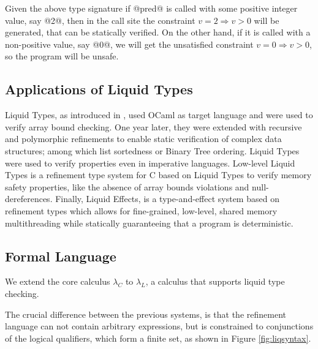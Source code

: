 Given the above type signature 
if @pred@ is called with some positive integer value, say @2@,
then in the call site the constraint $v = 2 \Rightarrow v >0$ will be generated, 
that can be statically verified.
%
On the other hand, if it is called with a non-positive value, 
say @0@, we will get the unsatisfied constraint
$v = 0 \Rightarrow v > 0$, 
so the program will be unsafe.

\subsection{Applications of Liquid Types}
Liquid Types, as introduced in \cite{LiquidPLDI08}, used OCaml as target language
and were used to verify array bound checking.
One year later\cite{LiquidPLDI09}, they were extended with recursive and polymorphic refinements
to enable static verification of complex data structures; among which 
list sortedness or Binary Tree ordering.
%
Liquid Types were used to verify properties even in imperative languages.
Low-level Liquid Types\cite{Rondon10} is a refinement type system for
C based on Liquid Types to verify memory safety properties, 
like the absence of array bounds violations
and null-dereferences.
Finally, Liquid Effects\cite{Kawaguchi12},
is a type-and-effect system based on refinement types
which allows for fine-grained, low-level, shared memory multithreading while statically guaranteeing that a program is deterministic. 

\subsection{Formal Language}
We extend the core calculus $\lambda_C$ to $\lambda_L$, 
a calculus that supports liquid type checking.

The crucial difference between the previous systems, is that 
the refinement language 
can not contain arbitrary expressions, but 
is constrained
to conjunctions of the logical qualifiers, which form a finite set, 
as shown in Figure \ref{fig:liqsyntax}.

